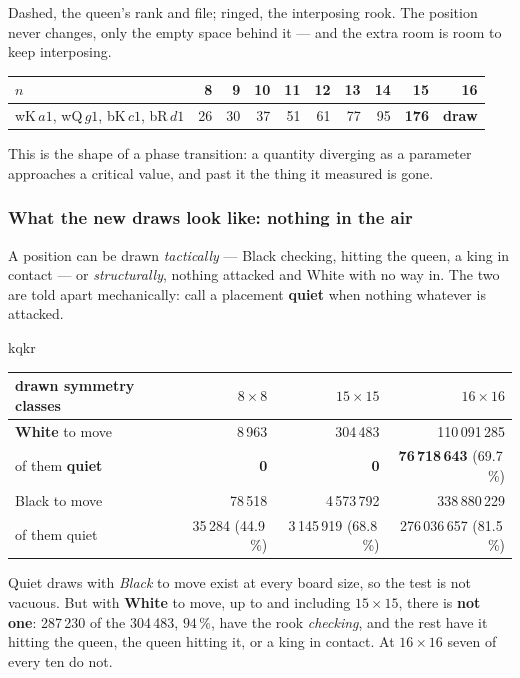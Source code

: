 \documentclass[10pt]{article}
\begin{document}
\medskip
\noindent
Dashed, the queen's rank and file; ringed, the interposing rook. The position
never changes, only the empty space behind it --- and the extra room is room to
keep interposing.

\begin{center}\small
\begin{tabular}{@{}lrrrrrrrrr@{}}
\toprule
$n$ & 8 & 9 & 10 & 11 & 12 & 13 & 14 & 15 & 16 \\
\midrule
wK\,$a1$, wQ\,$g1$, bK\,$c1$, bR\,$d1$ & 26 & 30 & 37 & 51 & 61 & 77 & 95 &
  \textbf{176} & \textbf{draw} \\
\bottomrule
\end{tabular}
\end{center}

\noindent
This is the shape of a phase transition: a quantity diverging as a parameter
approaches a critical value, and past it the thing it measured is gone.

\subsubsection{What the new draws look like: nothing in the air}\label{sub:kqkr-quiet}

\noindent
A position can be drawn \emph{tactically} --- Black checking, hitting the
queen, a king in contact --- or \emph{structurally}, nothing attacked and White
with no way in. The two are told apart mechanically: call a placement
\textbf{quiet} when nothing whatever is attacked.

\begin{result}[title={Below the transition every draw White faces is tactical; above it most are not}]{kqkr}
\begin{center}\small
\begin{tabular}{@{}lrrr@{}}
\toprule
drawn symmetry classes & $8\times8$ & $15\times15$ & $16\times16$ \\
\midrule
\textbf{White} to move            & 8\,963 & 304\,483 & 110\,091\,285 \\
\quad of them \textbf{quiet}      & \textbf{0} & \textbf{0} & \textbf{76\,718\,643} (69.7\,\%) \\
\addlinespace
Black to move                     & 78\,518 & 4\,573\,792 & 338\,880\,229 \\
\quad of them quiet               & 35\,284 (44.9\,\%) & 3\,145\,919 (68.8\,\%) & 276\,036\,657 (81.5\,\%) \\
\bottomrule
\end{tabular}
\end{center}

\smallskip
Quiet draws with \emph{Black} to move exist at every board size, so the test is
not vacuous. But with \textbf{White} to move, up to and including $15\times15$,
there is \textbf{not one}: 287\,230 of the 304\,483, $94\,\%$, have the rook
\emph{checking}, and the rest have it hitting the queen, the queen hitting it,
or a king in contact. At $16\times16$ seven of every ten do not.
\end{result}
\end{document}
